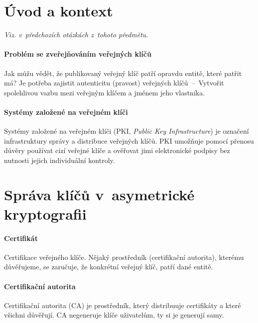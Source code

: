 
\section{Úvod a kontext}

\textit{Viz.  v~předchozích otázkách z~tohoto předmětu.}

\paragraph*{Problém se zveřejňováním veřejných klíčů} Jak můžu vědět, že publikovaný veřejný klíč patří opravdu entitě, které patřit má? Je potřeba zajistit autenticitu (pravost) veřejných klíčů~--~Vytvořit spolehlivou vazbu mezi veřejným klíčem a jménem jeho vlastníka.

\paragraph*{Systémy založené na veřejném klíči} Systémy založené na veřejném klíči (PKI, \textit{Public Key Infrastructure}) je označení infrastruktury správy a distribuce veřejných klíčů. PKI umožňuje pomocí přenosu důvěry používat cizí veřejné klíče a ověřovat jimi elektronické podpisy bez nutnosti jejich individuální kontroly.


\section{Správa klíčů v~asymetrické kryptografii}

\paragraph*{Certifikát} Certifikace veřejného klíče. Nějaký prostředník (certifikační autorita), kterému důvěřujeme, se zaručuje, že konkrétní veřejný klíč, patří dané entitě.

\paragraph*{Certifikační autorita} Certifikační autorita (CA) je prostředník, který distribuuje certifikáty a které všichni důvěřují. CA negeneruje klíče uživatelům, ty si je generují samy.

